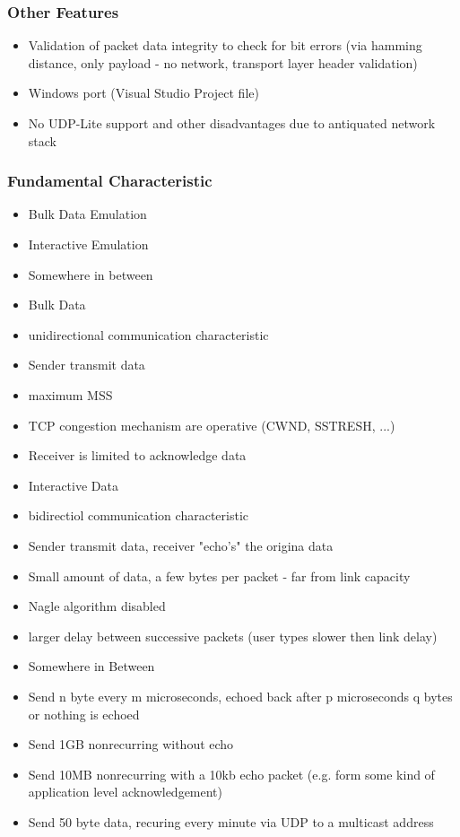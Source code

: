 \documentclass[xcolor=pdftex,dvipsnames,table]{beamer}
\begin{document}
\begin{frame}
\frametitle{Other Features}
\begin{itemize}
	\item Validation of packet data integrity to check for bit errors (via hamming distance, only payload - no network, transport
	layer header validation)
	\item Windows port (Visual Studio Project file)
	\bi
		\item No UDP-Lite support and other disadvantages due to antiquated network stack
	\ei
\end{itemize}
\end{frame}



\begin{frame}
\frametitle{Fundamental Characteristic}
\begin{itemize}
	\item Bulk Data Emulation
	\item Interactive Emulation
	\item Somewhere in between
	\item Bulk Data
	\bi
		\item unidirectional communication characteristic
		\item Sender transmit data
		\item maximum MSS
		\item TCP congestion mechanism are operative (CWND, SSTRESH, ...)
		\item Receiver is limited to acknowledge data
	\ei
	\item Interactive Data
	\bi
		\item bidirectiol communication characteristic
		\item Sender transmit data, receiver "echo's" the origina data
		\item Small amount of data, a few bytes per packet -  far from link capacity
		\item Nagle algorithm disabled
		\item larger delay between successive packets (user types slower then link delay)
	\ei
	\item Somewhere in Between
	\bi
		\item Send n byte every m microseconds, echoed back after p microseconds q bytes or nothing is echoed
		\item Send 1GB nonrecurring without echo
		\item Send 10MB nonrecurring with a 10kb echo packet (e.g. form some kind of application level acknowledgement)
		\item Send 50 byte data, recuring every minute via UDP to a multicast address
	\ei
\end{itemize}
\end{frame}
\end{document}
